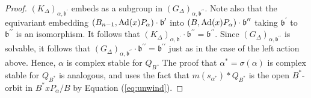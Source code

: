 \documentclass[12pt]{amsart}
\numberwithin{equation}{section}
\newcommand{\fb}{\mbox{${\mathfrak b}$}}
\newcommand{\Ad}{{\rm Ad}}
\newcommand{\ms}{m(s_{\alpha})}
\begin{document}
\begin{proof}
$(K_{\Delta})_{\alpha,\fb^{\prime}}$ embeds as a subgroup in $(G_{\Delta})_{\alpha, \fb^{\prime\prime}}.$
Note also that the equivariant embedding $(B_{n-1},\Ad(x)P_{\alpha})\cdot \fb^{\prime}$ into $(B,\Ad(x)P_{\alpha})\cdot \fb^{\prime\prime}$ taking $\fb^{\prime}$ to $\fb^{\prime\prime}$ is an isomorphism. It follows that 
$(K_{\Delta})_{\alpha,\fb^{\prime}}\cdot \fb^{\prime\prime}=\fb^{\prime\prime}.$   Since $(G_{\Delta})_{\alpha, \fb^{\prime\prime}}$ is solvable, it follows that $(G_{\Delta})_{\alpha,\fb^{\prime\prime}}\cdot\fb^{\prime\prime}=\fb^{\prime\prime}$ just as in the case of the left action above.  Hence, $\alpha$ is complex stable for $Q_B.$  The proof that $\alpha^{*}=\sigma(\alpha)$ is complex stable for $Q_{B^{*}}$ is  analogous, and uses  the fact that $m(s_{\alpha^{*}})*Q_{B^{*}}$ is the open $B^{*}$-orbit in $B^{*}x P_{\alpha}/B$ by Equation (\ref{eq:unwind}).
\end{proof}




\end{document}
